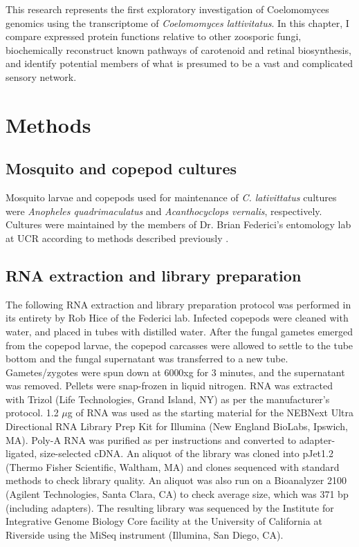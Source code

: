 \indent This research represents the first exploratory investigation of Coelomomyces genomics using the transcriptome of \textit{Coelomomyces lattivitatus}. In this chapter, I compare expressed protein functions relative to other zoosporic fungi, biochemically reconstruct known pathways of carotenoid and retinal biosynthesis, and identify potential members of what is presumed to be a vast and complicated sensory network. \\
\section{Methods}
\subsection*{Mosquito and copepod cultures}
Mosquito larvae and copepods used for maintenance of \textit{C. lativittatus} cultures were \textit{Anopheles quadrimaculatus} and \textit{Acanthocyclops vernalis}, respectively. Cultures were maintained by the members of Dr. Brian Federici's entomology lab at UCR according to methods described previously \cite{Federici1983}.\\ 
\subsection*{RNA extraction and library preparation}
The following RNA extraction and library preparation protocol was performed in its entirety by Rob Hice of the Federici lab. Infected copepods were cleaned with water, and placed in tubes with distilled water. After the fungal gametes emerged from the copepod larvae, the copepod carcasses were allowed to settle to the tube bottom and the fungal supernatant was transferred to a new tube. Gametes/zygotes were spun down at 6000xg for 3 minutes, and the supernatant was removed. Pellets were snap-frozen in liquid nitrogen. RNA was extracted with Trizol  (Life Technologies, Grand Island, NY) as per the manufacturer's protocol. 1.2 $\mu$g of RNA was used as the starting material for the NEBNext Ultra Directional RNA Library Prep Kit for Illumina (New England BioLabs, Ipswich, MA). Poly-A RNA was purified as per instructions and converted to adapter-ligated, size-selected cDNA. An aliquot of the library was cloned into pJet1.2 (Thermo Fisher Scientific, Waltham, MA) and clones sequenced with standard methods to check library quality. An aliquot was also run on a Bioanalyzer 2100 (Agilent Technologies, Santa Clara, CA) to check average size, which was 371 bp (including adapters). The resulting library was sequenced by the Institute for Integrative Genome Biology Core facility at the University of California at Riverside using the MiSeq instrument (Illumina, San Diego, CA).\\
